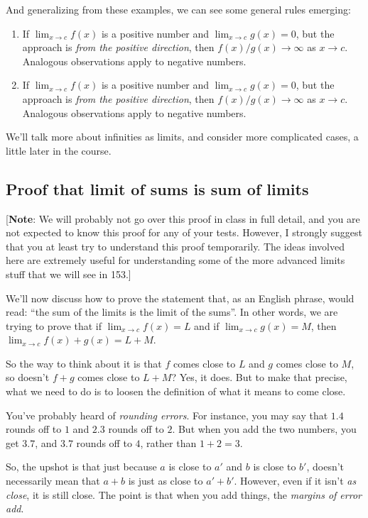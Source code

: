 \documentclass[10pt]{amsart}
\begin{document}
And generalizing from these examples, we can see some general rules
emerging:

\begin{enumerate}
\item If $\lim_{x \to c} f(x)$ is a positive number and $\lim_{x \to
  c} g(x) = 0$, but the approach is {\em from the positive direction},
  then $f(x)/g(x) \to \infty$ as $x \to c$. Analogous observations
  apply to negative numbers.
\item If $\lim_{x \to c} f(x)$ is a positive number and $\lim_{x \to
  c} g(x) = 0$, but the approach is {\em from the positive direction},
  then $f(x)/g(x) \to \infty$ as $x \to c$. Analogous observations
  apply to negative numbers.
\end{enumerate}

We'll talk more about infinities as limits, and consider more
complicated cases, a little later in the course.

\subsection{Proof that limit of sums is sum of limits}

[{\bf Note}: We will probably not go over this proof in class in full
detail, and you are not expected to know this proof for any of your
tests. However, I strongly suggest that you at least try to understand
this proof temporarily. The ideas involved here are extremely useful
for understanding some of the more advanced limits stuff that we will
see in 153.]

We'll now discuss how to prove the statement that, as an English
phrase, would read: ``the sum of the limits is the limit of the
sums''. In other words, we are trying to prove that if $\lim_{x \to c}
f(x) = L$ and if $\lim_{x \to c} g(x) = M$, then $\lim_{x \to c} f(x)
+ g(x) = L + M$.

So the way to think about it is that $f$ comes close to $L$ and $g$
comes close to $M$, so doesn't $f + g$ comes close to $L + M$? Yes, it
does. But to make that precise, what we need to do is to loosen the
definition of what it means to come close.

You've probably heard of {\em rounding errors}. For instance, you may
say that $1.4$ rounds off to $1$ and $2.3$ rounds off to $2$. But when
you add the two numbers, you get $3.7$, and $3.7$ rounds off to $4$,
rather than $1 + 2 = 3$.

So, the upshot is that just because $a$ is close to $a'$ and $b$ is
close to $b'$, doesn't necessarily mean that $a + b$ is just as close
to $a' + b'$. However, even if it isn't {\em as close}, it is still
close. The point is that when you add things, the {\em margins of
error add}.
\end{document}
